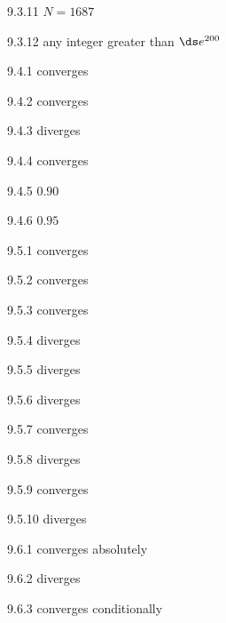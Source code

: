 \begin{Answer}{9.3.11}
$N=1687$
\end{Answer}
\begin{Answer}{9.3.12}
any integer greater than $\ds e^{200}$
\end{Answer}
\begin{Answer}{9.4.1}
converges
\end{Answer}
\begin{Answer}{9.4.2}
converges
\end{Answer}
\begin{Answer}{9.4.3}
diverges
\end{Answer}
\begin{Answer}{9.4.4}
converges
\end{Answer}
\begin{Answer}{9.4.5}
$0.90$
\end{Answer}
\begin{Answer}{9.4.6}
$0.95$
\end{Answer}
\begin{Answer}{9.5.1}
converges
\end{Answer}
\begin{Answer}{9.5.2}
converges
\end{Answer}
\begin{Answer}{9.5.3}
converges
\end{Answer}
\begin{Answer}{9.5.4}
diverges
\end{Answer}
\begin{Answer}{9.5.5}
diverges
\end{Answer}
\begin{Answer}{9.5.6}
diverges
\end{Answer}
\begin{Answer}{9.5.7}
converges
\end{Answer}
\begin{Answer}{9.5.8}
diverges
\end{Answer}
\begin{Answer}{9.5.9}
converges
\end{Answer}
\begin{Answer}{9.5.10}
diverges
\end{Answer}
\begin{Answer}{9.6.1}
converges absolutely
\end{Answer}
\begin{Answer}{9.6.2}
diverges
\end{Answer}
\begin{Answer}{9.6.3}
converges conditionally
\end{Answer}
